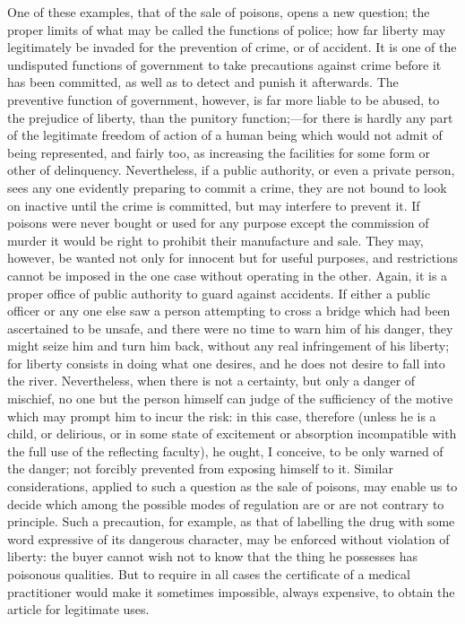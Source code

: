 \documentclass[11pt,openany]{book}
\begin{document}
One of these examples, that of the sale of poisons, opens a new question; the proper limits of what may be called the functions of police; how far liberty may legitimately be invaded for the prevention of crime, or of accident. It is one of the undisputed functions of government to take precautions against crime before it has been committed, as well as to detect and punish it afterwards. The preventive function of government, however, is far more liable to be abused, to the prejudice of liberty, than the punitory function;---for there is hardly any part of the legitimate freedom of action of a human being which would not admit of being represented, and fairly too, as increasing the facilities for some form or other of delinquency. Nevertheless, if a public authority, or even a private person, sees any one evidently preparing to commit a crime, they are not bound to look on inactive until the crime is committed, but may interfere to prevent it. If poisons were never bought or used for any purpose except the commission of murder it would be right to prohibit their manufacture and sale. They may, however, be wanted not only for innocent but for useful purposes, and restrictions cannot be imposed in the one case without operating in the other. Again, it is a proper office of public authority to guard against accidents. If either a public officer or any one else saw a person attempting to cross a bridge which had been ascertained to be unsafe, and there were no time to warn him of his danger, they might seize him and turn him back, without any real infringement of his liberty; for liberty consists in doing what one desires, and he does not desire to fall into the river. Nevertheless, when there is not a certainty, but only a danger of mischief, no one but the person himself can judge of the sufficiency of the motive which may prompt him to incur the risk: in this case, therefore (unless he is a child, or delirious, or in some state of excitement or absorption incompatible with the full use of the reflecting faculty), he ought, I conceive, to be only warned of the danger; not forcibly prevented from exposing himself to it. Similar considerations, applied to such a question as the sale of poisons, may enable us to decide which among the possible modes of regulation are or are not contrary to principle. Such a precaution, for example, as that of labelling the drug with some word expressive of its dangerous character, may be enforced without violation of liberty: the buyer cannot wish not to know that the thing he possesses has poisonous qualities. But to require in all cases the certificate of a medical practitioner would make it sometimes impossible, always expensive, to obtain the article for legitimate uses.
\end{document}
